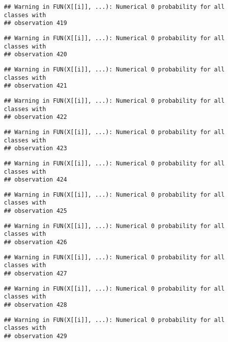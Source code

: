 \documentclass[
]{article}
\begin{document}
\begin{verbatim}
## Warning in FUN(X[[i]], ...): Numerical 0 probability for all classes with
## observation 419
\end{verbatim}

\begin{verbatim}
## Warning in FUN(X[[i]], ...): Numerical 0 probability for all classes with
## observation 420
\end{verbatim}

\begin{verbatim}
## Warning in FUN(X[[i]], ...): Numerical 0 probability for all classes with
## observation 421
\end{verbatim}

\begin{verbatim}
## Warning in FUN(X[[i]], ...): Numerical 0 probability for all classes with
## observation 422
\end{verbatim}

\begin{verbatim}
## Warning in FUN(X[[i]], ...): Numerical 0 probability for all classes with
## observation 423
\end{verbatim}

\begin{verbatim}
## Warning in FUN(X[[i]], ...): Numerical 0 probability for all classes with
## observation 424
\end{verbatim}

\begin{verbatim}
## Warning in FUN(X[[i]], ...): Numerical 0 probability for all classes with
## observation 425
\end{verbatim}

\begin{verbatim}
## Warning in FUN(X[[i]], ...): Numerical 0 probability for all classes with
## observation 426
\end{verbatim}

\begin{verbatim}
## Warning in FUN(X[[i]], ...): Numerical 0 probability for all classes with
## observation 427
\end{verbatim}

\begin{verbatim}
## Warning in FUN(X[[i]], ...): Numerical 0 probability for all classes with
## observation 428
\end{verbatim}

\begin{verbatim}
## Warning in FUN(X[[i]], ...): Numerical 0 probability for all classes with
## observation 429
\end{verbatim}
\end{document}
